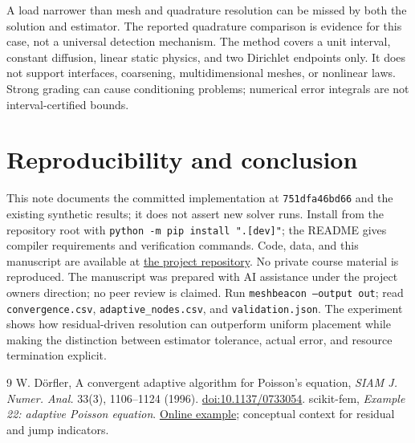\documentclass[10pt,a4paper]{article}
\begin{document}
A load narrower than mesh and quadrature resolution can be missed by both the solution and estimator. The reported quadrature comparison is evidence for this case, not a universal detection mechanism. The method covers a unit interval, constant diffusion, linear static physics, and two Dirichlet endpoints only. It does not support interfaces, coarsening, multidimensional meshes, or nonlinear laws. Strong grading can cause conditioning problems; numerical error integrals are not interval-certified bounds.
\section{Reproducibility and conclusion}
This note documents the committed implementation at \texttt{751dfa46bd66} and the existing synthetic results; it does not assert new solver runs. Install from the repository root with \texttt{python -m pip install ".[dev]"}; the README gives compiler requirements and verification commands. Code, data, and this manuscript are available at \href{https://github.com/racostacme-come/meshbeacon}{the project repository}. No private course material is reproduced. The manuscript was prepared with AI assistance under the project owner\textquotesingle s direction; no peer review is claimed.
Run \texttt{meshbeacon --output out}; read \texttt{convergence.csv}, \texttt{adaptive\_nodes.csv}, and \texttt{validation.json}. The experiment shows how residual-driven resolution can outperform uniform placement while making the distinction between estimator tolerance, actual error, and resource termination explicit.
\begin{thebibliography}{9}
 W. D\"orfler, A convergent adaptive algorithm for Poisson's equation, \emph{SIAM J. Numer. Anal.} 33(3), 1106--1124 (1996). \href{https://doi.org/10.1137/0733054}{doi:10.1137/0733054}.
 scikit-fem, \emph{Example 22: adaptive Poisson equation}. \href{https://scikit-fem.readthedocs.io/en/latest/listofexamples.html#example-22-adaptive-poisson-equation}{Online example}; conceptual context for residual and jump indicators.
\end{thebibliography}
\end{document}
